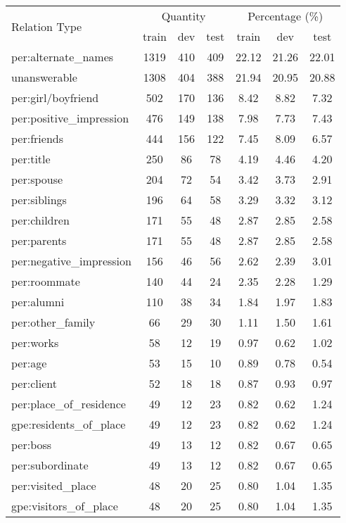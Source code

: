 \documentclass[11pt]{article}
\begin{document}
\begin{table*}[ht]
\centering

\begin{tabular}{l|ccc|ccc}
\toprule
 \multirow{2}{*}{Relation Type} & \multicolumn{3}{c}{Quantity} & \multicolumn{3}{c}{Percentage (\%)} \\
  & train & dev & test & train & dev & test \\
\midrule
per:alternate\_names & 1319 & 410 & 409 & 22.12 & 21.26 & 22.01  \\
unanswerable & 1308 & 404 & 388 & 21.94 & 20.95 & 20.88 \\
per:girl/boyfriend & 502 & 170 & 136 & 8.42 & 8.82 & 7.32 \\
per:positive\_impression & 476 & 149 & 138 & 7.98 & 7.73 & 7.43 \\
per:friends & 444 & 156 & 122 & 7.45 & 8.09 & 6.57 \\
per:title & 250 & 86 & 78 & 4.19 & 4.46 & 4.20 \\
per:spouse & 204 & 72 & 54 & 3.42 & 3.73 & 2.91 \\
per:siblings & 196 & 64 & 58 & 3.29 & 3.32 & 3.12 \\
per:children & 171 & 55 & 48 & 2.87 & 2.85 & 2.58 \\
per:parents & 171 & 55 & 48 & 2.87 & 2.85 & 2.58 \\
per:negative\_impression & 156 & 46 & 56 & 2.62 & 2.39 & 3.01 \\
per:roommate & 140 & 44 & 24 & 2.35 & 2.28 & 1.29 \\
per:alumni & 110 & 38 & 34 & 1.84 & 1.97 & 1.83 \\
per:other\_family & 66 & 29 & 30 & 1.11 & 1.50 & 1.61 \\
per:works & 58 & 12 & 19 & 0.97 & 0.62 & 1.02 \\
per:age & 53 & 15 & 10 & 0.89 & 0.78 & 0.54 \\
per:client & 52 & 18 & 18 & 0.87 & 0.93 & 0.97 \\
per:place\_of\_residence & 49 & 12 & 23 & 0.82 & 0.62 & 1.24 \\
gpe:residents\_of\_place & 49 & 12 & 23 & 0.82 & 0.62 & 1.24 \\
per:boss & 49 & 13 & 12 & 0.82 & 0.67 & 0.65 \\
per:subordinate & 49 & 13 & 12 & 0.82 & 0.67 & 0.65 \\
per:visited\_place & 48 & 20 & 25 & 0.80 & 1.04 & 1.35 \\
gpe:visitors\_of\_place & 48 & 20 & 25 & 0.80 & 1.04 & 1.35 \\

\end{tabular}
\end{table*}
\end{document}
